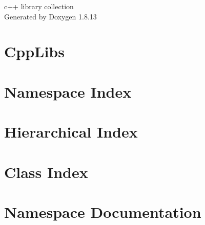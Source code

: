 \documentclass[twoside]{book}
\newcommand{\+}{\discretionary{\mbox{\scriptsize$\hookleftarrow$}}{}{}}
\newcommand{\clearemptydoublepage}{%
  \newpage{\pagestyle{empty}\cleardoublepage}%
}
\begin{document}
\hypersetup{pageanchor=false,
             bookmarksnumbered=true,
             pdfencoding=unicode
            }
\begin{titlepage}
\vspace*{7cm}
\begin{center}%
{\Large c++ library collection }\\
\vspace*{1cm}
{\large Generated by Doxygen 1.8.13}\\
\end{center}
\end{titlepage}
\clearemptydoublepage
{}
\tableofcontents
\clearemptydoublepage
{}
\hypersetup{pageanchor=true}

\chapter{Cpp\+Libs}
\label{md_README}

\chapter{Namespace Index}

\chapter{Hierarchical Index}

\chapter{Class Index}

\chapter{Namespace Documentation}


\end{document}

